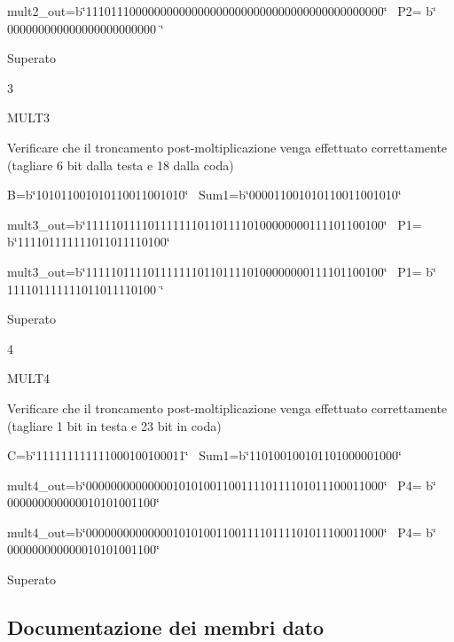 mult2\+\_\+out=b\char`\"{}111011100000000000000000000000000000000000000000\char`\"{}~\newline
 P2= b\char`\"{}        000000000000000000000000                \char`\"{} 

Superato  

3 

M\+U\+L\+T3 

Verificare che il troncamento post-\/moltiplicazione venga effettuato correttamente (tagliare 6 bit dalla testa e 18 dalla coda) 

B=b\char`\"{}101011001010110011001010\char`\"{}~\newline
 Sum1=b\char`\"{}000011001010110011001010\char`\"{}  

mult3\+\_\+out=b\char`\"{}111110111101111111011011110100000000111101100100\char`\"{}~\newline
 P1= b\char`\"{}111101111111011011110100\char`\"{} 

mult3\+\_\+out=b\char`\"{}111110111101111111011011110100000000111101100100\char`\"{}~\newline
 P1= b\char`\"{}      111101111111011011110100                  \char`\"{} 

Superato  

4 

M\+U\+L\+T4 

Verificare che il troncamento post-\/moltiplicazione venga effettuato correttamente (tagliare 1 bit in testa e 23 bit in coda) 

C=b\char`\"{}111111111111000100100011\char`\"{}~\newline
 Sum1=b\char`\"{}110100100101101000001000\char`\"{}  

mult4\+\_\+out=b\char`\"{}000000000000001010100110011110111101011100011000\char`\"{}~\newline
 P4= b\char`\"{} 000000000000010101001100\char`\"{} 

mult4\+\_\+out=b\char`\"{}000000000000001010100110011110111101011100011000\char`\"{}~\newline
 P4= b\char`\"{} 000000000000010101001100\char`\"{} 

Superato  

\subsection{Documentazione dei membri dato}
\mbox{\label{class_linear_regression_1_1_structural_adea88291834bfbc1cfe284774c792d37}} 
